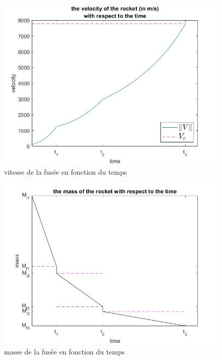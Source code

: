 \clearpage
\begin{center}
\begin{figure}[t]
\includegraphics[scale=0.55]{./graphs/velocity.jpg}
\caption{vitesse de la fusée en fonction du temps}
\end{figure}
\end{center}

\clearpage
\begin{center}
\begin{figure}[t]
\includegraphics[scale=0.55]{./graphs/mass.jpg}
\caption{masse de la fusée en fonction du temps}
\end{figure}
\end{center}